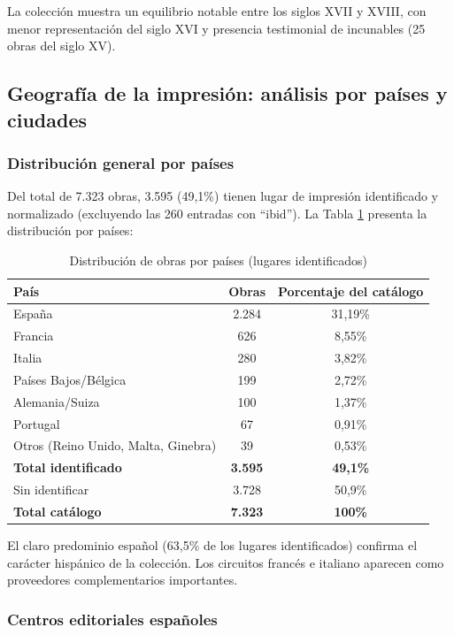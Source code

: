 \documentclass[12pt,a4paper]{article}
\begin{document}
La colección muestra un equilibrio notable entre los siglos XVII y XVIII, con menor representación del siglo XVI y presencia testimonial de incunables (25 obras del siglo XV).

\subsection{Geografía de la impresión: análisis por países y ciudades}

\subsubsection{Distribución general por países}

Del total de 7.323 obras, 3.595 (49,1\%) tienen lugar de impresión identificado y normalizado (excluyendo las 260 entradas con ``ibid''). La Tabla \ref{tab:paises} presenta la distribución por países:

\begin{table}[h]
\centering
\caption{Distribución de obras por países (lugares identificados)}
\label{tab:paises}
\begin{tabular}{lcc}
\toprule
\textbf{País} & \textbf{Obras} & \textbf{Porcentaje del catálogo} \\
\midrule
España & 2.284 & 31,19\% \\
Francia & 626 & 8,55\% \\
Italia & 280 & 3,82\% \\
Países Bajos/Bélgica & 199 & 2,72\% \\
Alemania/Suiza & 100 & 1,37\% \\
Portugal & 67 & 0,91\% \\
Otros (Reino Unido, Malta, Ginebra) & 39 & 0,53\% \\
\midrule
\textbf{Total identificado} & \textbf{3.595} & \textbf{49,1\%} \\
Sin identificar & 3.728 & 50,9\% \\
\midrule
\textbf{Total catálogo} & \textbf{7.323} & \textbf{100\%} \\
\bottomrule
\end{tabular}
\end{table}

El claro predominio español (63,5\% de los lugares identificados) confirma el carácter hispánico de la colección. Los circuitos francés e italiano aparecen como proveedores complementarios importantes.

\subsubsection{Centros editoriales españoles}
\end{document}

